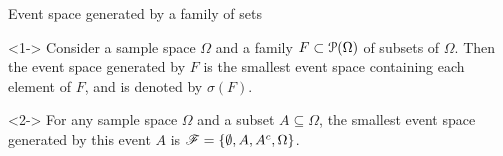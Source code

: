 \documentclass[12pt,aspectratio=169]{beamer}
\begin{document}



\begin{frame}{Event space generated by a family of sets}
    \begin{Definition}<1->
        Consider a sample space $\Omega$ and a family $F \subset \mathcal{P}(\Omega)$ of subsets of $\Omega$.   
        Then the event space generated by $F$ is the smallest event space containing each element of $F$, and is denoted by $\sigma(F)$. 
    \end{Definition}
        
    \begin{Example}<2->
        For any sample space $\Omega$ and a subset $A \subseteq \Omega$, the smallest event space generated by this event $A$ is $\mathscr{F} = \left\{\emptyset, A, A^c, \Omega\right\}$. 
    \end{Example}
\end{frame}
\end{document}
